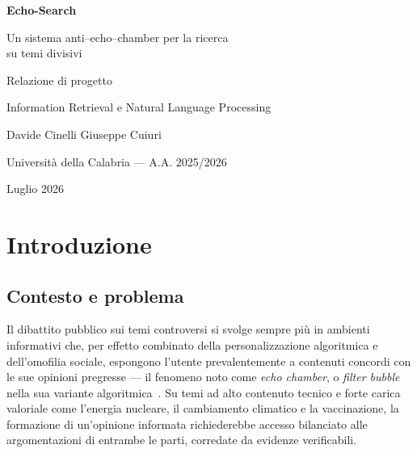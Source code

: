 \documentclass[11pt,a4paper]{report}
\begin{document}
\begin{titlepage}
\centering
\vspace*{1.5cm}
{\Huge\bfseries Echo-Search\par}
\vspace{0.5cm}
{\Large Un sistema anti--echo--chamber per la ricerca\\ su temi divisivi\par}
\vspace{1.6cm}
{\large Relazione di progetto\par}
\vspace{0.2cm}
{\normalsize Information Retrieval e Natural Language Processing\par}
\vspace{1.8cm}
\vfill
{\large Davide Cinelli \quad\textbar\quad Giuseppe Cuiuri\par}
\vspace{0.3cm}
{\normalsize Università della Calabria --- A.A. 2025/2026\par}
\vspace{0.3cm}
{\large Luglio 2026\par}
\end{titlepage}

\tableofcontents

\chapter{Introduzione}\label{cap:intro}

\section{Contesto e problema}
Il dibattito pubblico sui temi controversi si svolge sempre più in ambienti informativi che,
per effetto combinato della personalizzazione algoritmica e dell'omofilia sociale, espongono
l'utente prevalentemente a contenuti concordi con le sue opinioni pregresse --- il fenomeno
noto come \emph{echo chamber}, o \emph{filter bubble} nella sua variante
algoritmica~\cite{pariser,cinelli}. Su temi ad alto contenuto tecnico e forte carica
valoriale come l'energia nucleare, il cambiamento climatico e la vaccinazione, la formazione
di un'opinione informata richiederebbe accesso bilanciato alle argomentazioni di entrambe le
parti, corredate da evidenze verificabili.
\end{document}
